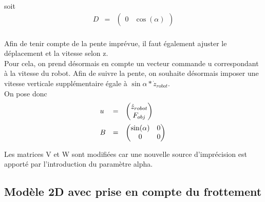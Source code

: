 \documentclass[12pt,twoside,a4paper]{article}
\begin{document}
soit
$$
\begin{array}{lll}
D &=& \begin{pmatrix} 0 & \cos(\alpha) \end{pmatrix} \\
\end{array}
$$

Afin de tenir compte de la pente imprévue, il faut également ajuster le déplacement et la vitesse selon z. \\
Pour cela, on prend désormais en compte un vecteur commande u correspondant à la vitesse du robot. Afin de suivre la pente, on souhaite désormais imposer une vitesse verticale supplémentaire égale à $\sin{\alpha}*\dot{z}_{robot}$. \\
On pose donc
$$
\begin{array}{lll}
u &=& \begin{pmatrix} \dot{z}_{robot} \\ F_{obj}\end{pmatrix} \\
B &=& \begin{pmatrix}	\sin(\alpha) & 0 \\ 0 & 0  \end{pmatrix} \rule{0pt}{20pt}\\
\end{array}
$$



\noindent Les matrices V et W sont modifiées car une nouvelle source d'imprécision est apporté par l'introduction du paramètre alpha.


\subsection{Modèle 2D avec prise en compte du frottement}
\end{document}
